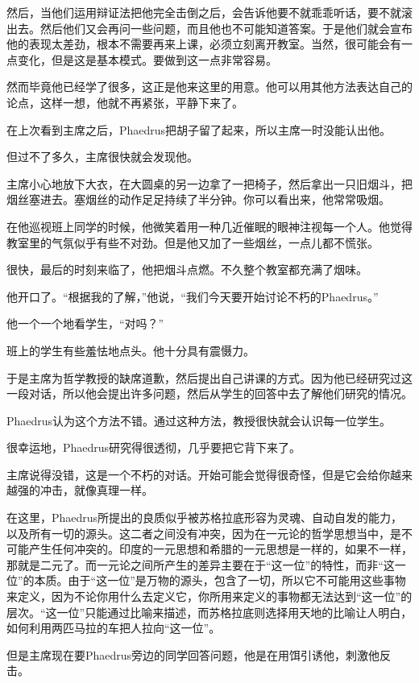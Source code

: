 \documentclass[UTF8]{article}
\begin{document}
\par 然后，当他们运用辩证法把他完全击倒之后，会告诉他要不就乖乖听话，要不就滚出去。然后他们又会再问一些问题，而且他也不可能知道答案。于是他们就会宣布他的表现太差劲，根本不需要再来上课，必须立刻离开教室。当然，很可能会有一点变化，但是这是基本模式。要做到这一点非常容易。
\par 然而毕竟他已经学了很多，这正是他来这里的用意。他可以用其他方法表达自己的论点，这样一想，他就不再紧张，平静下来了。
\par 在上次看到主席之后，Phaedrus把胡子留了起来，所以主席一时没能认出他。
\par 但过不了多久，主席很快就会发现他。
\par 主席小心地放下大衣，在大圆桌的另一边拿了一把椅子，然后拿出一只旧烟斗，把烟丝塞进去。塞烟丝的动作足足持续了半分钟。你可以看出来，他常常吸烟。
\par 在他巡视班上同学的时候，他微笑着用一种几近催眠的眼神注视每一个人。他觉得教室里的气氛似乎有些不对劲。但是他又加了一些烟丝，一点儿都不慌张。
\par 很快，最后的时刻来临了，他把烟斗点燃。不久整个教室都充满了烟味。
\par 他开口了。“根据我的了解，”他说，“我们今天要开始讨论不朽的Phaedrus。”
\par 他一个一个地看学生，“对吗？”
\par 班上的学生有些羞怯地点头。他十分具有震慑力。
\par 于是主席为哲学教授的缺席道歉，然后提出自己讲课的方式。因为他已经研究过这一段对话，所以他会提出许多问题，然后从学生的回答中去了解他们研究的情况。
\par Phaedrus认为这个方法不错。通过这种方法，教授很快就会认识每一位学生。
\par 很幸运地，Phaedrus研究得很透彻，几乎要把它背下来了。
\par 主席说得没错，这是一个不朽的对话。开始可能会觉得很奇怪，但是它会给你越来越强的冲击，就像真理一样。
\par 在这里，Phaedrus所提出的良质似乎被苏格拉底形容为灵魂、自动自发的能力，以及所有一切的源头。这二者之间没有冲突，因为在一元论的哲学思想当中，是不可能产生任何冲突的。印度的一元思想和希腊的一元思想是一样的，如果不一样，那就是二元了。而一元论之间所产生的差异主要在于“这一位”的特性，而非“这一位”的本质。由于“这一位”是万物的源头，包含了一切，所以它不可能用这些事物来定义，因为不论你用什么去定义它，你所用来定义的事物都无法达到“这一位”的层次。“这一位”只能通过比喻来描述，而苏格拉底则选择用天地的比喻让人明白，如何利用两匹马拉的车把人拉向“这一位”。
\par 但是主席现在要Phaedrus旁边的同学回答问题，他是在用饵引诱他，刺激他反击。
\end{document}
